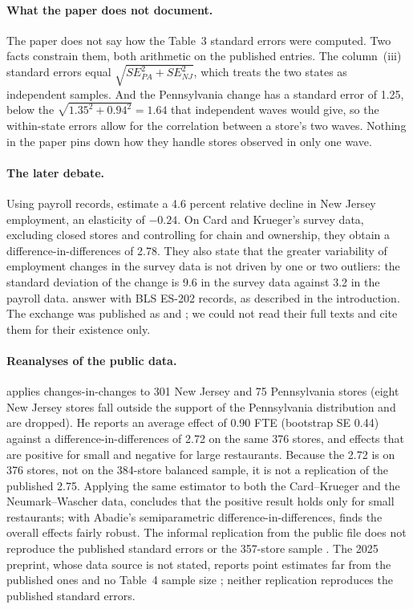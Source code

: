 \documentclass[11pt]{article}
\begin{document}
\paragraph{What the paper does not document.} The paper does not say how the Table~3
standard errors were computed. Two facts constrain them, both arithmetic on the published
entries. The column~(iii) standard errors equal $\sqrt{SE_{PA}^2 + SE_{NJ}^2}$, which treats
the two states as independent samples. And the Pennsylvania change has a standard error of
1.25, below the $\sqrt{1.35^2 + 0.94^2} = 1.64$ that independent waves would give, so the
within-state errors allow for the correlation between a store's two waves. Nothing in the
paper pins down how they handle stores observed in only one wave.

\paragraph{The later debate.} Using payroll records, \citet{neumark1995payroll} estimate a
4.6 percent relative decline in New Jersey employment, an elasticity of $-0.24$. On Card and
Krueger's survey data, excluding closed stores and controlling for chain and ownership, they
obtain a difference-in-differences of 2.78. They also state that the greater variability of
employment changes in the survey data is not driven by one or two outliers: the standard
deviation of the change is 9.6 in the survey data against 3.2 in the payroll data.
\citet{card1998reanalysis} answer with BLS ES-202 records, as described in the
introduction. The exchange was published as \citet{neumark2000comment} and
\citet{card2000reply}; we could not read their full texts and cite them for their
existence only.

\paragraph{Reanalyses of the public data.} \citet{ropponen2010cic} applies changes-in-changes
to 301 New Jersey and 75 Pennsylvania stores (eight New Jersey stores fall outside the
support of the Pennsylvania distribution and are dropped). He reports an average effect of
0.90 FTE (bootstrap SE 0.44) against a difference-in-differences of 2.72 on the same 376
stores, and effects that are positive for small and negative for large restaurants. Because
the 2.72 is on 376 stores, not on the 384-store balanced sample, it is not a replication of
the published 2.75. Applying the same estimator to both the Card--Krueger and the
Neumark--Wascher data, \citet{ropponen2011reconciling} concludes that the positive result
holds only for small restaurants; with Abadie's semiparametric difference-in-differences,
\citet{ropponen2014note} finds the overall effects fairly robust. The informal replication from the public file does not reproduce the published standard
errors or the 357-store sample \citep{mamula2021replicating}. The 2025 preprint, whose data
source is not stated, reports point estimates far from the published ones and no Table~4
sample size \citep{morshed2025replication}; neither replication reproduces the published
standard errors.
\end{document}
